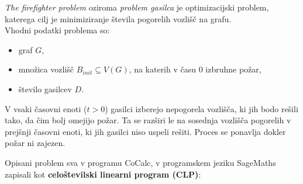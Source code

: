 \documentclass[a4paper, 12pt]{article}
\begin{document}
\noindent \emph{The firefighter problem} oziroma \emph{problem gasilca} je optimizacijski problem, katerega cilj je 
minimiziranje števila pogorelih vozlišč na grafu. \\
Vhodni podatki problema so:
\begin{itemize}
    \item graf $G,$
    \item množica vozlišč $B_{init} \subseteq V\left(G\right)$, na katerih v času $0$ izbruhne požar,
    \item število gasilcev $D$.
\end{itemize} 
V vsaki časovni enoti ($t > 0$) gasilci izberejo nepogorela vozlišča, ki jih bodo rešili tako,
da čim bolj omejijo požar. Ta se razširi le na sosednja vozlišča pogorelih v prejšnji časovni enoti,
ki jih gasilci niso uspeli rešiti. Proces se ponavlja dokler požar ni zajezen.

Opisani problem sva v programu CoCalc, v programskem jeziku SageMaths 
zapisali kot \textbf{celoštevilski linearni program (CLP)}: \\
\end{document}
